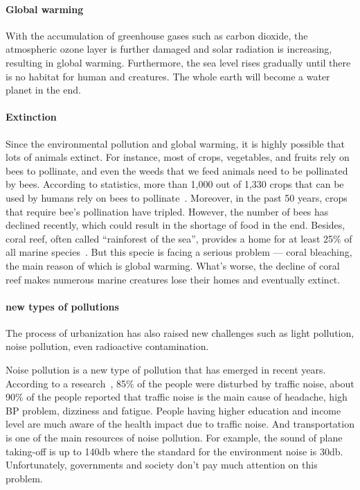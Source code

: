 \documentclass[letterpaper, twocolumn, 10pt, conference]{IEEEtran}
\begin{document}

\paragraph{Global warming}

With the accumulation of greenhouse gases such as carbon dioxide, the atmospheric ozone layer is further damaged and solar radiation is increasing, resulting in global warming. Furthermore, the sea level rises gradually until there is no habitat for human and creatures. The whole earth will become a water planet in the end.

\paragraph{Extinction}

Since the environmental pollution and global warming, it is highly possible that lots of animals extinct. For instance, most of crops, vegetables, and fruits rely on bees to pollinate, and even the weeds that we feed animals need to be pollinated by bees. According to statistics, more than 1,000 out of 1,330 crops that can be used by humans rely on bees to pollinate~\cite{worldwatch1998bees}. Moreover, in the past 50 years, crops that require bee's pollination have tripled. However, the number of bees has declined recently, which could result in the shortage of food in the end. Besides, coral reef, often called \enquote{rainforest of the sea}, provides a home for at least 25\% of all marine species~\cite{white2008contaminant}. But this specie is facing a serious problem --- coral bleaching, the main reason of which is global warming. What's worse, the decline of coral reef makes numerous marine creatures lose their homes and eventually extinct.

\paragraph{new types of pollutions}
The process of urbanization has also raised new challenges such as light pollution, noise pollution, even radioactive contamination.
 
Noise pollution is a new type of pollution that has emerged in recent years. According to a research~\cite{pathak2008evaluation}, 85\% of the people were disturbed by traffic noise, about 90\% of the people reported that traffic noise is the main cause of headache, high BP problem, dizziness and fatigue. People having higher education and income level are much aware of the health impact due to traffic noise. And transportation is one of the main resources of noise pollution. For example, the sound of plane taking-off is up to 140db where the standard for the environment noise is 30db. Unfortunately, governments and society don't pay much attention on this problem.
 
\end{document}
